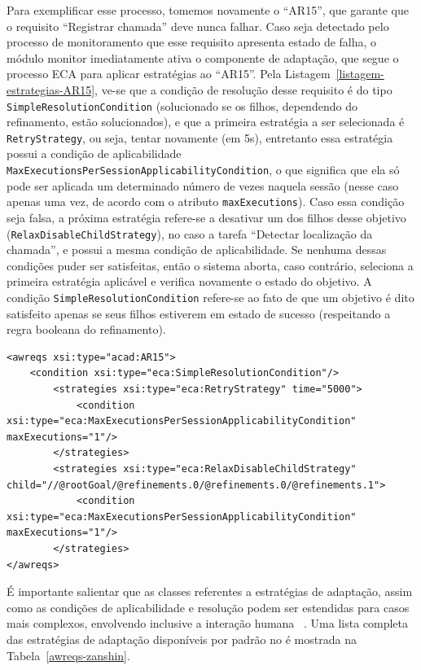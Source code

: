 Para exemplificar esse processo, tomemos novamente o \awreq ``AR15'', que garante que o requisito ``Registrar chamada'' deve nunca falhar. Caso seja detectado pelo processo de monitoramento que esse requisito apresenta estado de falha, o módulo monitor imediatamente ativa o componente de adaptação, que segue o processo ECA para aplicar estratégias ao ``AR15''. Pela Listagem~\ref{listagem-estrategias-AR15}, ve-se que a condição de resolução desse requisito é do tipo \texttt{SimpleResolutionCondition} (solucionado se os filhos, dependendo do refinamento, estão solucionados), e que a primeira estratégia a ser selecionada é \texttt{RetryStrategy}, ou seja, tentar novamente (em 5s), entretanto essa estratégia possui a condição de aplicabilidade \texttt{MaxExecutionsPerSessionApplicabilityCondition}, o que significa que ela só pode ser aplicada um determinado número de vezes naquela sessão (nesse caso apenas uma vez, de acordo com o atributo \texttt{maxExecutions}). Caso essa condição seja falsa, a próxima estratégia refere-se a desativar um dos filhos desse objetivo (\texttt{RelaxDisableChildStrategy}), no caso a tarefa ``Detectar localização da chamada'', e possui a mesma condição de aplicabilidade. Se nenhuma dessas condições puder ser satisfeitas, então o sistema aborta, caso contrário, seleciona a primeira estratégia aplicável e verifica novamente o estado do objetivo. A condição \texttt{SimpleResolutionCondition} refere-se ao fato de que um objetivo é dito satisfeito apenas se seus filhos estiverem em estado de sucesso (respeitando a regra booleana do refinamento). 

\begin{lstlisting}[caption={Estratégias de adaptação de AR15},label={listagem-estrategias-AR15}]
<awreqs xsi:type="acad:AR15">										
	<condition xsi:type="eca:SimpleResolutionCondition"/>
		<strategies xsi:type="eca:RetryStrategy" time="5000">
			<condition xsi:type="eca:MaxExecutionsPerSessionApplicabilityCondition" maxExecutions="1"/>
		</strategies>
		<strategies xsi:type="eca:RelaxDisableChildStrategy" child="//@rootGoal/@refinements.0/@refinements.0/@refinements.1">
			<condition xsi:type="eca:MaxExecutionsPerSessionApplicabilityCondition" maxExecutions="1"/>
		</strategies>
</awreqs>
\end{lstlisting}

É importante salientar que as classes referentes a estratégias de adaptação, assim como as condições de aplicabilidade e resolução podem ser estendidas para casos mais complexos, envolvendo inclusive a interação humana ~\cite{tesevitor}. Uma lista completa das estratégias de adaptação disponíveis por padrão no \zanshin é mostrada na Tabela~\ref{awreqs-zanshin}.

